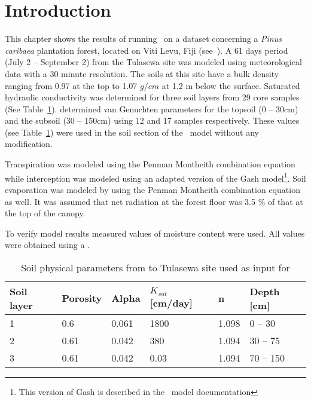 \section{Introduction}
This chapter shows the results of running \vamps\ on a dataset
concerning a {\em Pinus caribaea} plantation forest, located on Viti
Levu, Fiji (see~). A 61 days period (July 2
-- September 2) from the Tulasewa site was modeled using
meteorological data with a 30 minute resolution. The soils at this
site have a bulk density ranging from 0.97 at the top to 1.07 $g/cm$
at 1.2 m below the surface. Saturated hydraulic conductivity was
determined for three soil layers from 29 core samples (See
Table~\ref{tab:tul-soil}).  determined van
Genuchten parameters for the topsoil (0 -- 30cm) and the subsoil (30
-- 150cm) using 12 and 17 samples respectively. These values (see
Table~\ref{tab:tul-soil}) were used in the soil section of the \vamps\
model without any modification.

Transpiration was modeled using the Penman Montheith combination
equation while interception was modeled using an adapted version of
the Gash model\footnote{This version of Gash is described in the
\vamps\ model documentation}. Soil evaporation was modeled by using
the Penman Montheith combination equation as well. It was assumed that
net radiation at the forest floor was 3.5 \% of that at the top
of the canopy. 


To verify model results measured values of moisture content were used.
All values were obtained using a \Index{capacitance probe}. 

\begin{table}
\begin{tabular}{llllll}\hline\hline
Soil layer & Porosity & Alpha & $K_{sat}$[cm/day] & n & Depth [cm] \\ \hline
1	& 0.6 & 0.061 & 1800 & 1.098 & 0 -- 30 \\
2	& 0.61 & 0.042 & 380 	& 1.094 & 30 -- 75 \\
3	& 0.61 & 0.042 & 0.03  & 1.094 & 70 -- 150 \\
\hline\hline
\end{tabular}
\label{tab:tul-soil}
\caption{Soil physical parameters from to Tulasewa site used as input 
for \vamps{}}
\end{table}



